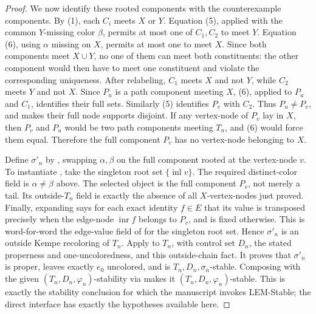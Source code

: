 \begin{proof}
We now identify these rooted components with the counterexample components.
By (1), each
$C_i$ meets $X$ or $Y$.  Equation (5), applied with the common
$Y$-missing color $\beta$, permits at most one
of $C_1,C_2$ to meet $Y$.  Equation (6), using $\alpha$ missing on
$X$, permits at most one to meet $X$.  Since both components meet
$X\cup Y$, no one of them can meet both constituents: the other component
would then have to meet one constituent and violate the corresponding
uniqueness.  After relabeling, $C_1$ meets $X$ and not $Y$, while $C_2$
meets $Y$ and not $X$.  Since $P_u$ is a path component meeting $X$,
(6), applied to $P_u$ and $C_1$, identifies their full
 sets.  Similarly (5) identifies $P_v$ with
$C_2$.  Thus $P_u\ne P_v$,
and  makes their full node supports
disjoint.  If any vertex-node of $P_v$ lay in $X$, then $P_v$ and $P_u$
would be two path components meeting $T_n$, and (6) would force them
equal.  Therefore the full component $P_v$ has no
vertex-node belonging to $X$.

Define $\sigma'_n$ by , swapping
$\alpha,\beta$ on the full component rooted at the vertex-node $v$.
To instantiate , take the singleton root
set $\{\operatorname{inl}v\}$.  The required distinct-color field is
$\alpha\ne\beta$ above.  The selected object is the full component
$P_v$, not merely a tail.  Its outside-$T_n$ field is exactly the absence
of all $X$-vertex-nodes just proved.  Finally, expanding
 says for each exact identity $f\in E$
that its value is transposed precisely when the edge-node
$\operatorname{inr}f$ belongs to $P_v$, and is fixed otherwise.  This is
word-for-word the edge-value field of
 for the singleton root set.  Hence
$\sigma'_n$ is an outside Kempe recoloring of $T_n$.
Apply  to $T_n$, with control
set $D_n$, the stated properness and one-uncoloredness, and this
outside-chain fact.  It proves that $\sigma'_n$ is proper, leaves
exactly $e_0$ uncolored, and is
$T_n,D_n,\sigma_n$-stable.  Composing with the given
$(T_n,D_n,\varphi_n)$-stability via  makes it
$(T_n,D_n,\varphi_n)$-stable.  This is exactly the stability conclusion
for which the manuscript invokes LEM-Stable; the direct
 interface has exactly the hypotheses
available here.


\end{proof}
